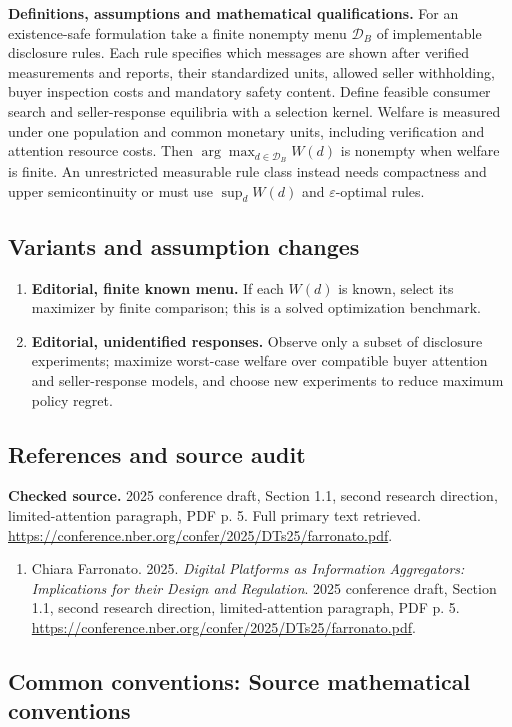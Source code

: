 \documentclass[11pt,a4paper]{article}
\begin{document}
\textbf{Definitions, assumptions and mathematical qualifications.} For an existence-safe formulation take a finite nonempty menu \(\mathcal D_B\) of implementable disclosure rules. Each rule specifies which messages are shown after verified measurements and reports, their standardized units, allowed seller withholding, buyer inspection costs and mandatory safety content. Define feasible consumer search and seller-response equilibria with a selection kernel. Welfare is measured under one population and common monetary units, including verification and attention resource costs. Then \(\arg\max_{d\in\mathcal D_B}W(d)\) is nonempty when welfare is finite. An unrestricted measurable rule class instead needs compactness and upper semicontinuity or must use \(\sup_dW(d)\) and \(\varepsilon\)-optimal rules.
\subsection*{Variants and assumption changes}
\begin{enumerate}
\item \textbf{Editorial, finite known menu.} If each \(W(d)\) is known, select its maximizer by finite comparison; this is a solved optimization benchmark.
\item \textbf{Editorial, unidentified responses.} Observe only a subset of disclosure experiments; maximize worst-case welfare over compatible buyer attention and seller-response models, and choose new experiments to reduce maximum policy regret.
\end{enumerate}
\subsection*{References and source audit}
\textbf{Checked source.} 2025 conference draft, Section 1.1, second research direction, limited-attention paragraph, PDF p. 5. Full primary text retrieved. \url{https://conference.nber.org/confer/2025/DTs25/farronato.pdf}.
\begin{enumerate}\raggedright
\item\hypertarget{definitions:source:30007684:1}{} Chiara Farronato. 2025. \emph{Digital Platforms as Information Aggregators: Implications for their Design and Regulation}. 2025 conference draft, Section 1.1, second research direction, limited-attention paragraph, PDF p. 5.
\url{https://conference.nber.org/confer/2025/DTs25/farronato.pdf}.
\end{enumerate}

\subsection*{Common conventions: Source mathematical conventions}
\end{document}
